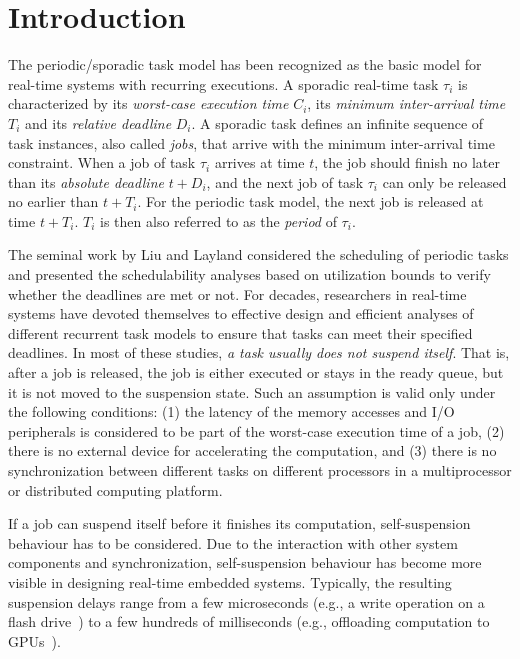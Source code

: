 \section{Introduction}

The periodic/sporadic task model has been recognized as the basic
model for real-time systems with recurring executions.  A sporadic
real-time task $\tau_i$ is characterized by its \emph{worst-case execution
time} $C_i$, its \emph{minimum
  inter-arrival time} $T_i$ and its
\emph{relative deadline} $D_i$. A sporadic task defines an infinite
sequence of task instances, also called \emph{jobs}, that arrive with
the minimum inter-arrival time constraint. When a job of task $\tau_i$
arrives at time $t$, the job should finish no later than its
\emph{absolute deadline} $t+D_i$, and the next job of task $\tau_i$
can only be released no earlier than $t+T_i$. For the periodic task
model, the next job is released at time $t+T_i$. $T_i$ is
then also referred to as the \emph{period} of $\tau_i$.


The seminal work by Liu and Layland \cite{Liu_1973} considered the
scheduling of periodic tasks and presented the schedulability analyses
based on utilization bounds to verify whether the deadlines are met or
not.  For decades, researchers in real-time systems have
devoted themselves to effective design and efficient analyses of
different recurrent task models to ensure that tasks can meet their
specified deadlines. In most of these studies, \emph{a task usually does not
 suspend itself}. That is, after a job is released, the job
is either executed or stays in the ready queue, but it is not moved to
the suspension state.  Such an assumption is valid only under the
following conditions: (1) the latency of the memory accesses and I/O
peripherals is considered to be part of the worst-case execution time
of a job, (2) there is no external device for accelerating the
computation, and (3) there is no synchronization between different
tasks on different processors in a multiprocessor or distributed
computing platform.


If a job can suspend itself before it finishes its computation,
self-suspension behaviour has to be considered. Due to the interaction
with other system components and synchronization, self-suspension
behaviour has become more visible in designing real-time embedded
systems.  Typically, the resulting suspension delays range from a few
microseconds (e.g., a write operation on a flash
drive~\cite{Kang:rtss07}) to a few hundreds of milliseconds (e.g.,
offloading computation to GPUs~\cite{Kato_2011,Liu_2014}).

